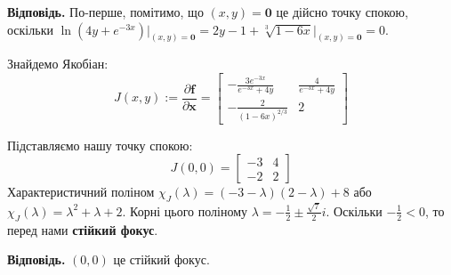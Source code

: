 \documentclass[14pt]{extarticle}
\begin{document}
\textbf{Відповідь.} По-перше, помітимо, що $(x,y) = \mathbf{0}$ це дійсно точку спокою, оскільки $\ln(4y+e^{-3x})\Big|_{(x,y)=\mathbf{0}}=2y-1+\sqrt[3]{1-6x}\Big|_{(x,y)=\mathbf{0}}=0$.

Знайдемо Якобіан:
\[
J(x,y) := \frac{\partial \boldsymbol{f}}{\partial \mathbf{x}} = \begin{bmatrix}
    -\frac{3e^{-3x}}{e^{-3x}+4y} & \frac{4}{e^{-3x}+4y} \\
    -\frac{2}{(1-6x)^{2/3}} & 2
\end{bmatrix}
\]

Підставляємо нашу точку спокою:
\[
J(0,0) = \begin{bmatrix}
    -3 & 4 \\ -2 & 2
\end{bmatrix}
\]
Характеристичний поліном $\chi_J(\lambda)=(-3-\lambda)(2-\lambda) + 8$ або $\chi_J(\lambda)=\lambda^2+\lambda+2$. Корні цього поліному $\lambda=-\frac{1}{2}\pm\frac{\sqrt{7}}{2}i$. Оскільки $-\frac{1}{2}<0$, то перед нами \textbf{стійкий фокус}. 

\textbf{Відповідь.} $(0,0)$ це стійкий фокус.

\pagebreak
\end{document}
